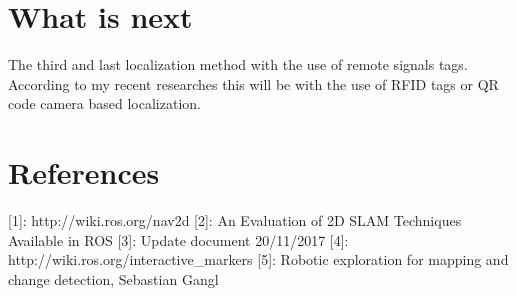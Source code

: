 \documentclass[11pt,a4paper]{article}
\begin{document}
\section{What is next}

The third and last localization method with the use of remote signals tags. According to my recent researches this will be with the use of RFID tags or QR code camera based localization.



\section{References} \label{sec:ref}
[1]: http://wiki.ros.org/nav2d
[2]: An Evaluation of 2D SLAM Techniques Available in ROS
[3]: Update document 20/11/2017
[4]: http://wiki.ros.org/interactive{\_}markers
[5]: Robotic exploration for mapping and change detection, Sebastian Gangl
\end{document}
